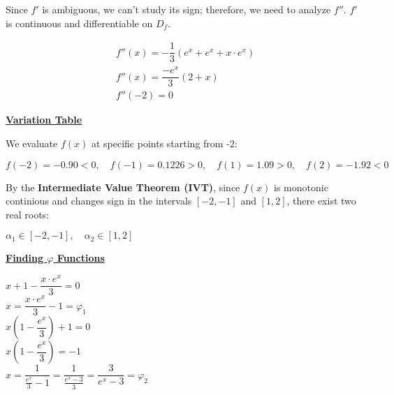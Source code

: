 \vspace{1cm}

Since \( f' \) is ambiguous, we can't study its sign; therefore, we need to analyze \( f'' \).  
\( f' \) is continuous and differentiable on \( D_f \).

\begin{center}
    \begin{align*}
        &f''(x) =  - \dfrac{1}{3}(e^{x}+e^{x}+x\cdot e^{x})\\[0.1cm] 
        &\boxed{f''(x) =  \dfrac{-e^{x}}{3}(2+x)}\\[0.1cm]
        &\boxed{f''(-2) = 0}
    \end{align*}
\end{center}

\newpage
\textbf{\underline{Variation Table}}

\begin{center}
\end{center}

\vspace{0.5cm}

We evaluate \( f(x) \) at specific points starting from -2:

\vspace{0.25cm}
\begin{center}
 \( f(-2) = -0.90 < 0, \quad f(-1) = 0.1226 > 0, \quad f(1) = 1.09 > 0, \quad f(2) = -1.92 < 0\)
\end{center}

\vspace{0.35cm}

By the \textbf{Intermediate Value Theorem (IVT)}, since \( f(x) \) is monotonic continious and changes sign in the intervals \( [-2, -1] \) and \( [1,2] \), there exist two real roots:

\begin{center}
    \(\boxed{\alpha_1 \in [-2, -1], \quad \alpha_2 \in [1, 2]}\)
\end{center}

\vspace{1cm}
\textbf{\underline{Finding \(\varphi\) Functions}}

\begin{center}
    \(x+1 - \dfrac{x\cdot e^{x}}{3} = 0\)\\[0.15cm]
    \(\boxed{x =  \dfrac{x\cdot e^{x}}{3} -1  = \varphi_1}\)\\[0.75cm]
    \(x (1 - \dfrac{e^{x}}{3}) + 1 = 0\)\\[0.2cm]
    \(x (1 - \dfrac{e^{x}}{3})  = - 1\)\\[0.2cm]
    \(\boxed{x = \dfrac{1}{\frac{e^{x}}{3}-1} = \dfrac{1}{\frac{e^{x} - 3}{3}} = \dfrac{3}{e^{x}-3} = \varphi_2}\)\\[0.15cm]
\end{center}

